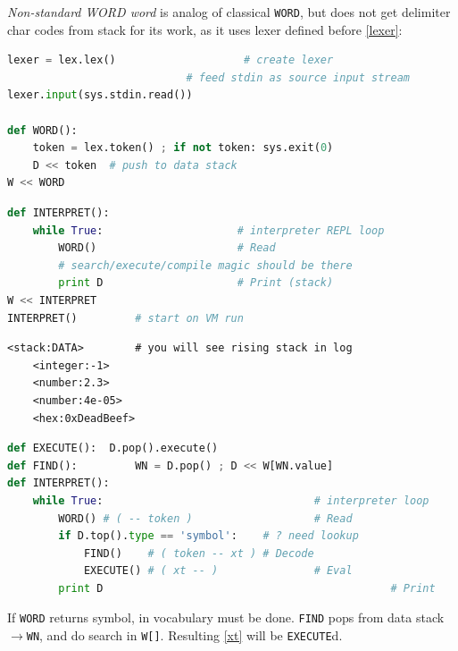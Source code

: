 \emph{Non-standard WORD word} is analog of classical \verb|WORD|, but does not
get delimiter char codes from stack for its work, as it uses lexer
defined before \ref{lexer}:
\begin{lstlisting}[language=Python]
lexer = lex.lex()              		 # create lexer
							# feed stdin as source input stream
lexer.input(sys.stdin.read())

def WORD():
	token = lex.token() ; if not token: sys.exit(0)
	D << token	# push to data stack
W << WORD
\end{lstlisting}
\clearpage\noindent
\begin{lstlisting}[language=Python]
def INTERPRET():
    while True:						# interpreter REPL loop
        WORD()						# Read
		# search/execute/compile magic should be there
        print D						# Print (stack)
W << INTERPRET
INTERPRET()			# start on VM run
\end{lstlisting}
\begin{lstlisting}
<stack:DATA>		# you will see rising stack in log
	<integer:-1>
	<number:2.3>
	<number:4e-05>
	<hex:0xDeadBeef>
\end{lstlisting}
\clearpage\noindent

\begin{lstlisting}[language=Python]
def EXECUTE():	D.pop().execute()
def FIND():			WN = D.pop() ; D << W[WN.value]
def INTERPRET():
	while True:									# interpreter loop
		WORD() # ( -- token )					# Read
		if D.top().type == 'symbol':	# ? need lookup
			FIND()    # ( token -- xt )	# Decode
			EXECUTE() # ( xt -- )				# Eval
		print D												# Print
\end{lstlisting}
If \verb|WORD| returns symbol,  in vocabulary must be done.
\verb|FIND| pops  from data stack $\rightarrow$\verb|WN|, and do
search in \verb|W[]|. Resulting  \ref{xt} will be
\verb|EXECUTE|d.
